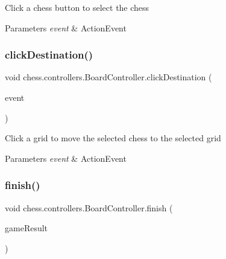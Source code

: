Click a chess button to select the chess


\begin{DoxyParams}{Parameters}
{\em event} & Action\+Event \\
\hline
\end{DoxyParams}
\mbox{\label{classchess_1_1controllers_1_1_board_controller_a0cfbeef7ff00ff604806817044c2051f}} 
\subsubsection{\texorpdfstring{click\+Destination()}{clickDestination()}}
{\footnotesize\ttfamily void chess.\+controllers.\+Board\+Controller.\+click\+Destination (\begin{DoxyParamCaption}\item[{Mouse\+Event}]{event }\end{DoxyParamCaption})}

Click a grid to move the selected chess to the selected grid


\begin{DoxyParams}{Parameters}
{\em event} & Action\+Event \\
\hline
\end{DoxyParams}
\mbox{\label{classchess_1_1controllers_1_1_board_controller_abb3a608cfc953e6f0e11a274bfb7f1f8}} 
\subsubsection{\texorpdfstring{finish()}{finish()}}
{\footnotesize\ttfamily void chess.\+controllers.\+Board\+Controller.\+finish (\begin{DoxyParamCaption}\item[{\mbox{\hyperlink{enumchess_1_1models_1_1enums_1_1_game_result}{Game\+Result}}}]{game\+Result }\end{DoxyParamCaption})}

